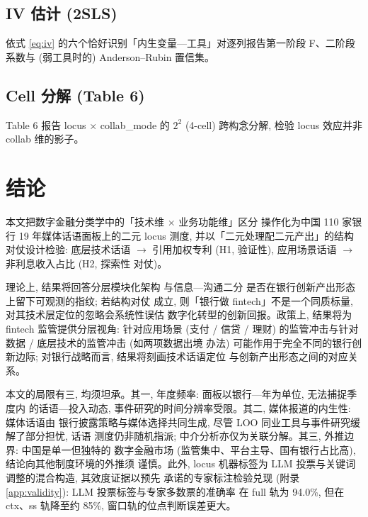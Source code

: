 \subsection{IV 估计 (2SLS)}

依式 \eqref{eq:iv} 的六个恰好识别「内生变量—工具」对逐列报告第一阶段 F、二阶段
系数与 (弱工具时的) Anderson--Rubin 置信集。

\subsection{Cell 分解 (Table 6)}

Table 6 报告 locus $\times$ collab\_mode 的 $2^2$ (4-cell) 跨构念分解,
检验 locus 效应并非 collab 维的影子。

\section{结论}\label{sec:conclusion}

本文把数字金融分类学中的「技术维 $\times$ 业务功能维」区分
\parencite{gomber2017cube} 操作化为中国 110 家银行 19 年媒体话语面板上的二元
locus 测度, 并以「二元处理配二元产出」的结构对仗设计检验: 底层技术话语
$\to$ 引用加权专利 (H1, 验证性), 应用场景话语 $\to$ 非利息收入占比 (H2, 探索性
对仗)。

理论上, 结果将回答分层模块化架构 \parencite{yoo2010layered} 与信息—沟通二分
\parencite{boot2021fintech} 是否在银行创新产出形态上留下可观测的指纹; 若结构对仗
成立, 则「银行做 fintech」不是一个同质标量, 对其技术层定位的忽略会系统性误估
数字化转型的创新回报。政策上, 结果将为 fintech 监管提供分层视角: 针对应用场景
(支付 / 信贷 / 理财) 的监管冲击与针对数据 / 底层技术的监管冲击 (如两项数据出境
办法) 可能作用于完全不同的银行创新边际; 对银行战略而言, 结果将刻画技术话语定位
与创新产出形态之间的对应关系。

本文的局限有三, 均须坦承。其一, 年度频率: 面板以银行—年为单位, 无法捕捉季度内
的话语—投入动态, 事件研究的时间分辨率受限。其二, 媒体报道的内生性: 媒体话语由
银行披露策略与媒体选择共同生成, 尽管 LOO 同业工具与事件研究缓解了部分担忧, 话语
测度仍非随机指派; 中介分析亦仅为关联分解。其三, 外推边界: 中国是单一但独特的
数字金融市场 (监管集中、平台主导、国有银行占比高), 结论向其他制度环境的外推须
谨慎。此外, locus 机器标签为 LLM 投票与关键词调整的混合构造, 其效度证据以预先
承诺的专家标注检验兑现 (附录 \ref{app:validity}): LLM 投票标签与专家多数票的准确率
在 full 轨为 94.0\%, 但在 ctx、ss 轨降至约 85\%, 窗口轨的位点判断误差更大。

